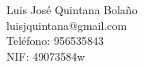 Luis José Quintana Bolaño \\ %
luisjquintana@gmail.com \\ %
Teléfono: 956535843 \\ %
NIF: 49073584w \\ %
